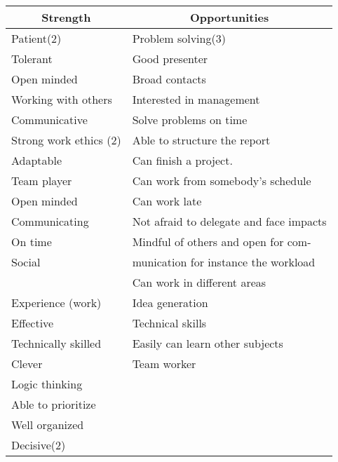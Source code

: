\begin{table}[!ht]
\centering
\begin{tabular}{|p{}|p{}|}
\hline
\multicolumn{1}{|c|}{\textbf {Strength}}                                                  & \multicolumn{1}{c|}{\textbf{Opportunities}}                          \\ \hline
Patient(2)                              & Problem solving(3)\\
Tolerant                                & Good presenter\\
Open minded                             & Broad contacts\\
Working with others                     & Interested in management\\ %
Communicative                           & Solve problems on time\\
Strong work ethics (2)                  & Able to structure the report\\
Adaptable                               & Can finish a project. \\
Team player                             & Can work from somebody's schedule\\
Open minded                             & Can work late\\
Communicating                           & Not afraid to delegate and face impacts\\
On time                                 & Mindful of others and open for com-\\
Social                                  & munication for instance the workload\\
                                        & Can work in different areas\\
Experience (work)                       & Idea generation\\
Effective                               & Technical skills\\
Technically skilled                     & Easily can learn other subjects\\
Clever                                  & Team worker\\
Logic thinking                          &\\
Able to prioritize                      &\\
Well organized                          & \\
Decisive(2)                             &\\

\end{tabular}
\end{table}
